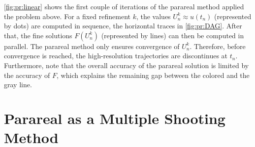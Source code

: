 \begin{example}
  \autoref{fig:pr:linear} shows the first couple of iterations of the parareal method applied the problem above.
  For a fixed refinement $k$,
  the values $U^k_n \approx u(t_n)$ (represented by dots) are computed in sequence,
  \cf the horizontal traces in \autoref{fig:pr:DAG}.
  After that, the fine solutions $F(U_n^k)$ (represented by lines) can then be computed in parallel.
  The parareal method only ensures convergence of $U_n^k$.
  Therefore, before convergence is reached,
  the high-resolution trajectories are discontinues at $t_n$.
  Furthermore, note that the overall accuracy of the parareal solution is limited by the accuracy of $F$,
  which explains the remaining gap between the colored and the gray line.
\end{example}

\section{Parareal as a Multiple Shooting Method}
\label{sec:pr:newton}

